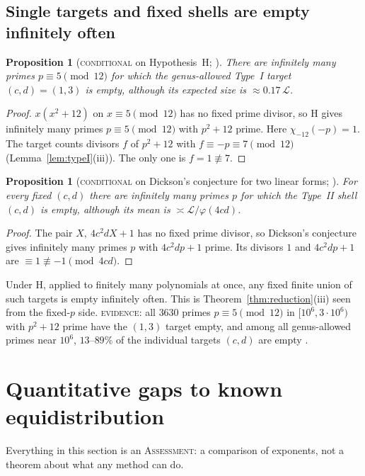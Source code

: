 \documentclass[10pt,reqno]{amsart}
\newtheorem{proposition}[theorem]{Proposition}
\theoremstyle{definition}
\numberwithin{equation}{section}
\newcommand{\cL}{\mathcal L}
\newcommand{\status}[1]{\textup{\textsc{#1}}}
\begin{document}
\subsection{Single targets and fixed shells are empty infinitely often}
\begin{proposition}[\status{conditional} on Hypothesis~H; {\cite[Prop.~5.3]{O123}}]\label{prop:emptyI}
There are infinitely many primes $p\equiv5\pmod{12}$ for which the
genus-allowed Type~I target $(c,d)=(1,3)$ is empty, although its expected
size is $\approx0.17\,\cL$.
\end{proposition}
\begin{proof}
$x(x^2+12)$ on $x\equiv5\pmod{12}$ has no fixed prime divisor, so H gives
infinitely many primes $p\equiv5\pmod{12}$ with $p^2+12$ prime. Here
$\chi_{-12}(-p)=1$. The target counts divisors $f$ of $p^2+12$ with
$f\equiv-p\equiv7\pmod{12}$ (Lemma~\ref{lem:typeI}(iii)). The only one is
$f=1\not\equiv7$.
\end{proof}

\begin{proposition}[\status{conditional} on Dickson's conjecture for two linear forms; {\cite[Lemma~1.2.1]{RT2}}]\label{prop:emptyII}
For every fixed $(c,d)$ there are infinitely many primes $p$ for which the
Type~II shell $(c,d)$ is empty, although its mean is
$\asymp\cL/\varphi(4cd)$.
\end{proposition}
\begin{proof}
The pair $X,\ 4c^2dX+1$ has no fixed prime divisor, so Dickson's
conjecture gives infinitely many primes $p$ with $4c^2dp+1$ prime. Its
divisors $1$ and $4c^2dp+1$ are $\equiv1\not\equiv-1\pmod{4cd}$.
\end{proof}
Under H, applied to finitely many polynomials at once, any fixed finite
union of such targets is empty infinitely often. This is
Theorem~\ref{thm:reduction}(iii) seen from the fixed-$p$ side.
\status{evidence}: all $3630$ primes $p\equiv5\pmod{12}$ in $[10^6,3\cdot10^6)$
with $p^2+12$ prime have the $(1,3)$ target empty, and among all
genus-allowed primes near $10^6$, $13$--$89\%$ of the individual targets
$(c,d)$ are empty \cite[\S3, \S5]{O123}.

\section{Quantitative gaps to known equidistribution}\label{sec:gaps}
Everything in this section is an \status{Assessment}: a comparison of
exponents, not a theorem about what any method can do.
\end{document}
